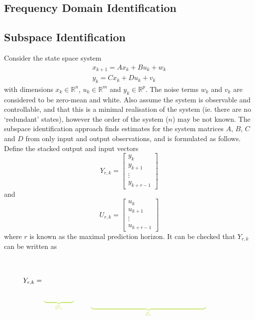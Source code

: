 \documentclass[11pt]{report} %
\begin{document}
\subsection{Frequency Domain Identification}

\subsection{Subspace Identification \cite{Ljung1999}}

Consider the state space system
\begin{gather}
x_{k + 1} = Ax_{k} + Bu_{k} + w_{k} \\
y_{k} = Cx_{k} + Du_{k} + v_{k}
\end{gather}
with dimensions $x_{k} \in \mathbb{R}^{n}$, $u_{k} \in \mathbb{R}^{m}$ and $y_{k} \in \mathbb{R}^{p}$. The noise terms $w_{k}$ and $v_{k}$ are considered to be zero-mean and white. Also assume the system is observable and controllable, and that this is a minimal realisation of the system (ie. there are no `redundant' states), however the order of the system ($n$) may be not known. The subspace identification approach finds estimates for the system matrices $A$, $B$, $C$ and $D$ from only input and output observations, and is formulated as follows. Define the stacked output and input vectors
\begin{equation}
Y_{r, k} = \begin{bmatrix}
y_{k} \\ y_{k + 1} \\ \vdots \\ y_{k + r - 1}
\end{bmatrix}
\end{equation}
and
\begin{equation}
U_{r, k} = \begin{bmatrix}
u_{k} \\ u_{k + 1} \\ \vdots \\ u_{k + r - 1}
\end{bmatrix}
\end{equation}
where $r$ is known as the maximal prediction horizon. It can be checked that $Y_{r, k}$ can be written as
\begin{equation}
Y_{r, k} = \green\underbrace{\black\begin{bmatrix}
C \\ CA \\ \vdots \\ CA^{r - 1}
\end{bmatrix}}_{\green \mathcal{O}_{r}}\black x_{k} + \green\underbrace{\black \begin{bmatrix}D\\
CB & D\\
\vdots & \vdots & \ddots\\
\vdots & \vdots &  & \ddots\\
CA^{r-2}B & CA^{r-3}B & \dots & CB & D
\end{bmatrix}}_{\green \mathcal{S}_{r}}\black U_{r, k} + V_{k}
\end{equation}
\end{document}
